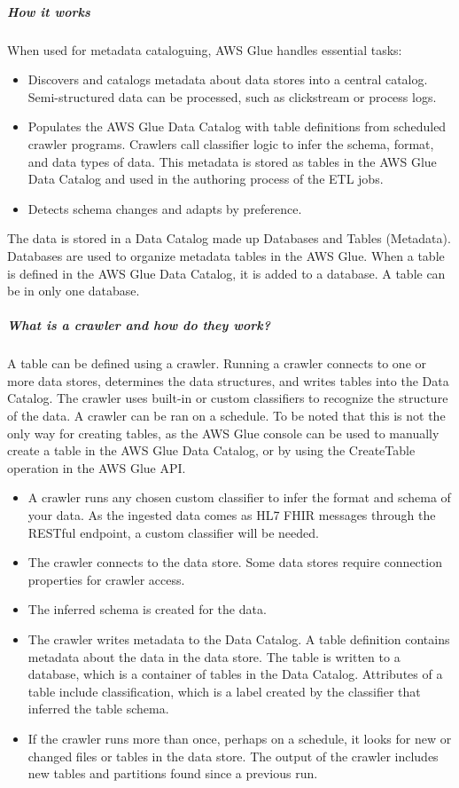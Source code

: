 \documentclass[10pt]{article}
\begin{document}
\subparagraph{How it works}When used for metadata cataloguing, AWS Glue handles essential tasks:
\begin{itemize}
    \item Discovers and catalogs metadata about data stores into a central catalog. Semi-structured data can be processed, such as clickstream or process logs.
    \item Populates the AWS Glue Data Catalog with table definitions from scheduled crawler programs. Crawlers call classifier logic to infer the schema, format, and data types of data. This metadata is stored as tables in the AWS Glue Data Catalog and used in the authoring process of the ETL jobs.
    \item Detects schema changes and adapts by preference.
\end{itemize}
The data is stored in a Data Catalog made up Databases and Tables (Metadata). Databases are used to organize metadata tables in the AWS Glue. When a table is defined in the AWS Glue Data Catalog, it is added to a database. A table can be in only one database. 

\subparagraph{What is a crawler and how do they work?}A table can be defined using a crawler. Running a crawler connects to one or more data stores, determines the data structures, and writes tables into the Data Catalog. The crawler uses built-in or custom classifiers to recognize the structure of the data. A crawler can be ran on a schedule. To be noted that this is not the only way for creating tables, as the AWS Glue console can be used to manually create a table in the AWS Glue Data Catalog, or by using the CreateTable operation in the AWS Glue API. \cite{aws-crawlers}
\begin{itemize}
    \item A crawler runs any chosen custom classifier to infer the format and schema of your data. As the ingested data comes as HL7 FHIR messages through the RESTful endpoint, a custom classifier will be needed.
    \item The crawler connects to the data store. Some data stores require connection properties for crawler access.
    \item The inferred schema is created for the data.
    \item The crawler writes metadata to the Data Catalog. A table definition contains metadata about the data in the data store. The table is written to a database, which is a container of tables in the Data Catalog. Attributes of a table include classification, which is a label created by the classifier that inferred the table schema.
    \item If the crawler runs more than once, perhaps on a schedule, it looks for new or changed files or tables in the data store. The output of the crawler includes new tables and partitions found since a previous run.
\end{itemize}
\end{document}

